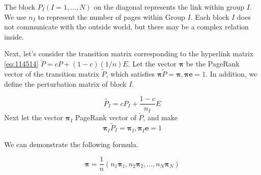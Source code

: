 \documentclass[lettersize,journal,12pt,conference]{IEEEtran}
\begin{document}
The block $ P_I (I = 1, \ldots, N)$ on the diagonal represents the link within group $I$. We use $n_I$ to represent the number of pages within Group $I$. Each block $I$ does not communicate with the outside world, but there may be a complex relation inside.

Next, let's consider the transition matrix corresponding to the hyperlink matrix \eqref{eq:114514} $\widetilde{P} = cP  + (1-c)(1/n)E$. Let the vector $\boldsymbol{\pi}$ be the PageRank vector of the transition matrix $\widetilde{P}$, which satisfies $\boldsymbol{\pi}\widetilde{P}=\boldsymbol{\pi}, \boldsymbol{\pi e}=1$. In addition, we define the perturbation matrix of block $I$.

\begin{equation}
	\widetilde{P_I}
	=cP_I + \frac{1-c}{n_I}E
\end{equation}
Next let the vector $\boldsymbol{\pi}_I$
PageRank vector of $\widetilde{P}$, and make
\begin{equation}
	\boldsymbol{\pi}_I\widetilde{P}_I = \boldsymbol{\pi}_I, \boldsymbol{\pi}_I\boldsymbol{e}=1
\end{equation}

We can demonstrate the following formula.

\begin{equation}
	\label{eq:4444}
	\boldsymbol{\pi}=\frac{1}{n}(n_1\boldsymbol{\pi}_1,  n_2\boldsymbol{\pi}_2,\ldots,n_N\boldsymbol{\pi}_N)
\end{equation}
\end{document}
